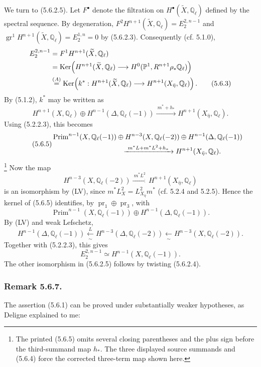 We turn to (5.6.2.5).  Let $F^\bullet$ denote the filtration on
$H^\bullet(\widetilde X,\mathbb Q_\ell)$ defined by the spectral sequence.
By degeneration,
$F^2H^{n+1}(\widetilde X,\mathbb Q_\ell)=E_2^{2,n-1}$ and
$\operatorname{gr}^1H^{n+1}(\widetilde X,\mathbb Q_\ell)=E_2^{1,n}=0$
by (5.6.2.3).  Consequently (cf. 5.1.0),
\begin{align}
E_2^{2,n-1}
 &=F^1H^{n+1}(\widetilde X,\mathbb Q_\ell) \notag\\
 &=\operatorname{Ker}\!\left(
 H^{n+1}(\widetilde X,\mathbb Q_\ell)
 \longrightarrow H^0(\mathbb P^1,R^{n+1}\rho_*\mathbb Q_\ell)
 \right) \notag\\
 &\overset{(A)}{=}
 \operatorname{Ker}\!\left(
 k^*:H^{n+1}(\widetilde X,\mathbb Q_\ell)
 \longrightarrow H^{n+1}(X_{\bar\eta},\mathbb Q_\ell)
 \right).
\tag{5.6.3}
\end{align}
By (5.1.2), $k^*$ may be written as
\begin{equation}\tag{5.6.4}
H^{n+1}(X,\mathbb Q_\ell)
\oplus H^{n-1}(\Delta,\mathbb Q_\ell(-1))
\xrightarrow{\ m^*+h_*\ }
H^{n+1}(X_{\bar\eta},\mathbb Q_\ell).
\end{equation}
Using (5.2.2.3), this becomes
\begin{equation}\tag{5.6.5}
\begin{split}
&\operatorname{Prim}^{n-1}(X,\mathbb Q_\ell(-1))
\oplus H^{n-3}(X,\mathbb Q_\ell(-2))
\oplus H^{n-1}(\Delta,\mathbb Q_\ell(-1))\\
&\hspace{35mm}\xrightarrow{\ m^*L+m^*L^2+h_*\ }
H^{n+1}(X_{\bar\eta},\mathbb Q_\ell).
\end{split}
\end{equation}
\footnote{The printed (5.6.5) omits several closing parentheses and the plus
sign before the third-summand map $h_*$.  The three displayed source
summands and (5.6.4) force the corrected three-term map shown here.}
Now the map
\[
H^{n-3}(X,\mathbb Q_\ell(-2))
\xrightarrow{\ m^*L^2\ }
H^{n+1}(X_{\bar\eta},\mathbb Q_\ell)
\]
is an isomorphism by (LV), since
$m^*L_X^2=L_{X_{\bar\eta}}^2m^*$ (cf. 5.2.4 and 5.2.5).  Hence the kernel
of (5.6.5) identifies, by $\operatorname{pr}_1\oplus\operatorname{pr}_3$,
with
\[
\operatorname{Prim}^{n-1}(X,\mathbb Q_\ell(-1))
\oplus H^{n-1}(\Delta,\mathbb Q_\ell(-1)).
\]
By (LV) and weak Lefschetz,
\[
H^{n-1}(\Delta,\mathbb Q_\ell(-1))
\xleftarrow[\sim]{\,L\,}
H^{n-3}(\Delta,\mathbb Q_\ell(-2))
\xleftarrow[\sim]{\ }
H^{n-3}(X,\mathbb Q_\ell(-2)).
\]
Together with (5.2.2.3), this gives
\begin{equation}\tag{5.6.6}
E_2^{2,n-1}\simeq H^{n-1}(X,\mathbb Q_\ell(-1)).
\end{equation}
The other isomorphism in (5.6.2.5) follows by twisting (5.6.2.4).

\subsubsection*{Remark 5.6.7.}
The assertion (5.6.1) can be proved under substantially weaker hypotheses,
as Deligne explained to me:
